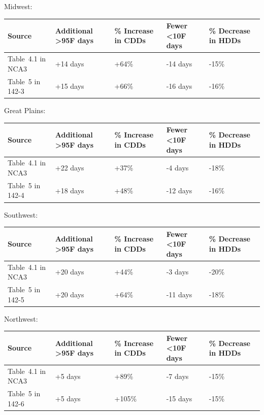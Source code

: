 \mbox{}

Midwest:

\begin{tabular}{|l|p{}|p{}|p{}|p{}|}
	\hline
	Source & Additional >95F days & \% Increase in CDDs & Fewer <10F days & \% Decrease in HDDs \\ 
	\hline
	Table~4.1 in NCA3 & +14 days & +64\% & -14 days & -15\% \\
	\hline
Table~5 in 142-3 & +15 days & +66\% & -16 days & -16\% \\
\hline
\end{tabular}

\mbox{}

Great Plains:

\begin{tabular}{|l|p{}|p{}|p{}|p{}|}
	\hline
	Source & Additional >95F days & \% Increase in CDDs & Fewer <10F days & \% Decrease in HDDs \\ 
	\hline
	Table~4.1 in NCA3 & +22 days & +37\% & -4 days & -18\% \\
	\hline
	Table~5 in 142-4 & +18 days & +48\% & -12 days & -16\% \\
	\hline
\end{tabular}

\mbox{}

Southwest:

\begin{tabular}{|l|p{}|p{}|p{}|p{}|}
	\hline
	Source & Additional >95F days & \% Increase in CDDs & Fewer <10F days & \% Decrease in HDDs \\ 
	\hline
	Table~4.1 in NCA3 & +20 days & +44\% & -3 days & -20\% \\
	\hline
	Table~5 in 142-5 & +20 days & +64\% & -11 days & -18\% \\
	\hline
\end{tabular}

\mbox{}

Northwest:

\begin{tabular}{|l|p{}|p{}|p{}|p{}|}
	\hline
	Source & Additional >95F days & \% Increase in CDDs & Fewer <10F days & \% Decrease in HDDs \\ 
	\hline
	Table~4.1 in NCA3 & +5 days & +89\% & -7 days & -15\% \\
	\hline
	Table~5 in 142-6 & +5 days & +105\% & -15 days & -15\% \\
	\hline
\end{tabular}

